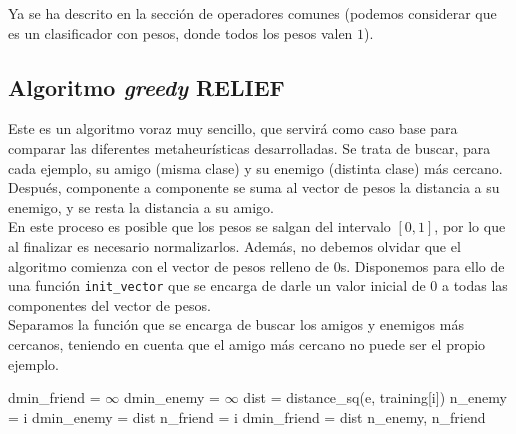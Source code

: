 \documentclass[12pt]{article}
\begin{document}
Ya se ha descrito en la sección de operadores comunes (podemos considerar que es un clasificador con pesos, donde todos los pesos valen $1$).

\subsection*{{\color{red} Algoritmo \textit{greedy} RELIEF}}

Este es un algoritmo voraz muy sencillo, que servirá como caso base para comparar las diferentes metaheurísticas desarrolladas. Se trata de buscar, para cada ejemplo, su amigo (misma clase) y su enemigo (distinta clase) más cercano. Después, componente a componente se suma al vector de pesos la distancia a su enemigo, y se resta la distancia a su amigo.\\

En este proceso es posible que los pesos se salgan del intervalo $[0,1]$, por lo que al finalizar es necesario normalizarlos. Además, no debemos olvidar que el algoritmo comienza con el vector de pesos relleno de $0$s. Disponemos para ello de una función \verb|init_vector| que se encarga de darle un valor inicial de $0$ a todas las componentes del vector de pesos.\\

Separamos la función que se encarga de buscar los amigos y enemigos más cercanos, teniendo en cuenta que el amigo más cercano no puede ser el propio ejemplo.

\begin{algorithm}[h]
\begin{algorithmic}

     \State dmin\_friend = $\infty$
     \State dmin\_enemy = $\infty$
       
            \State dist = distance\_sq(e, training[i])
                  \State n\_enemy = i
                  \State dmin\_enemy = dist
                  \State n\_friend = i
                  \State dmin\_friend = dist
            \EndIf
          \EndIf
       \EndFor
   \State \Return n\_enemy, n\_friend
\EndFunction

\end{algorithmic}
\end{algorithm}
\end{document}
